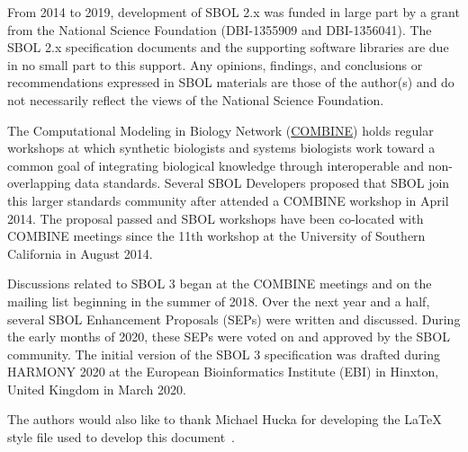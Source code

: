 From 2014 to 2019, development of SBOL 2.x was funded in large part by a grant from the National Science Foundation (DBI-1355909 and DBI-1356041).  The SBOL 2.x specification documents and the supporting software libraries are due in no small part to this support. Any opinions, findings, and conclusions or recommendations expressed in SBOL materials are those of the author(s) and do not necessarily reflect the views of the National Science Foundation.

The Computational Modeling in Biology Network (\href{www.co.mbine.org}{COMBINE}) holds regular workshops at which synthetic biologists and systems biologists work toward a common goal of integrating biological knowledge through interoperable and non-overlapping data standards. Several SBOL Developers proposed that SBOL join this larger standards community after attended a COMBINE workshop in April 2014.  The proposal passed and SBOL workshops have been co-located with COMBINE meetings since the 11th workshop at the University of Southern California in August 2014.

Discussions related to SBOL 3 began at the COMBINE meetings and on the mailing list beginning in the summer of 2018.  Over the next year and a half, several SBOL Enhancement Proposals (SEPs) were written and discussed.  During the early months of 2020, these SEPs were voted on and approved by the SBOL community.  The initial version of the SBOL 3 specification was drafted during HARMONY 2020 at the European Bioinformatics Institute (EBI) in Hinxton, United Kingdom in March 2020.

The authors would also like to thank Michael Hucka for developing the LaTeX style file used to develop this document~\citep{hucka2017sbmlpkgspec}.

